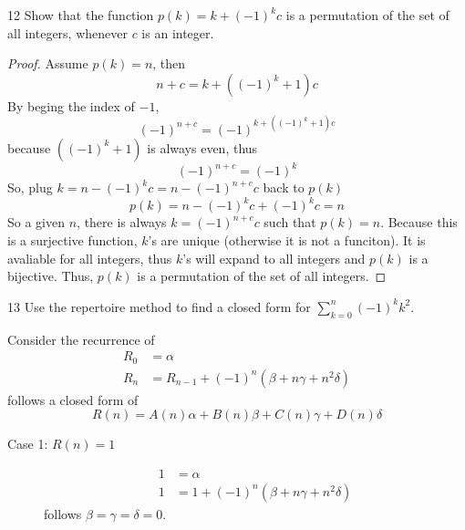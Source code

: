 \documentclass[a4paper,12pt]{article}
\makeatletter
\newtheorem*{solution}{Solution}
\theoremstyle{definition}
\renewenvironment{solution}[1][Solution] {\par\pushQED{\qed}\normalfont\topsep6\p@\@plus6\p@\relax\trivlist\item[\hskip\labelsep\bfseries#1\@addpunct{.}]\ignorespaces}{\popQED\endtrivlist\@endpefalse} \makeatother
\newenvironment{problems}{\begin{list}{}{\renewcommand{\makelabel}[1]{\textbf{##1}\hfil}}}{\end{list}}
\makeatother
\begin{document}
\begin{problems}
    \item[12] Show that the function $p(k) =k+ (-1)^kc$ is a permutation of the set of all integers, whenever $c$ is an integer.
    \begin{proof}
        Assume $p(k)=n$, then
        \begin{equation*}
            n+c=k+\left((-1)^k + 1\right)c
        \end{equation*}
        By beging the index of $-1$,
        \begin{equation*}
            (-1)^{n+c} = (-1)^{k+\left((-1)^k+1\right)c}
        \end{equation*}
        because $\left((-1)^k+1\right)$ is always even, thus
        \begin{equation*}
            (-1)^{n+c} = (-1)^k
        \end{equation*}
        So, plug $k=n-(-1)^kc=n-(-1)^{n+c}c$ back to $p(k)$
        \begin{equation*}
            p(k)=n-(-1)^kc+(-1)^kc=n
        \end{equation*}
        So a given $n$, there is always $k=(-1)^{n+c}c$ such that $p(k)=n$. Because this is a surjective function, $k$'s are unique (otherwise it is not a funciton). It is avaliable for all integers, thus $k$'s will expand to all integers and $p(k)$ is a bijective. Thus, $p(k)$ is a permutation of the set of all integers.
    \end{proof} 
    \item[13] Use the repertoire method to find a closed form for $\sum_{k=0}^n (-1)^kk^2$.
    \begin{solution}
        Consider the recurrence of 
        \begin{align*}
            R_0&=\alpha\\
            R_n&=R_{n-1}+(-1)^n(\beta+ n\gamma+ n^2\delta)
        \end{align*}
        follows a closed form of
        \begin{equation*}
            R(n) = A(n)\alpha + B(n)\beta + C(n)\gamma + D(n)\delta
        \end{equation*}
        \begin{description}
            \item[Case 1: $R(n)=1$]
            \begin{align*}
                1&=\alpha\\
                1&=1+(-1)^n(\beta+n\gamma+n^2\delta)
            \end{align*} 
            follows $\beta = \gamma =\delta = 0$.

\end{description}
\end{solution}
\end{problems}
\end{document}
